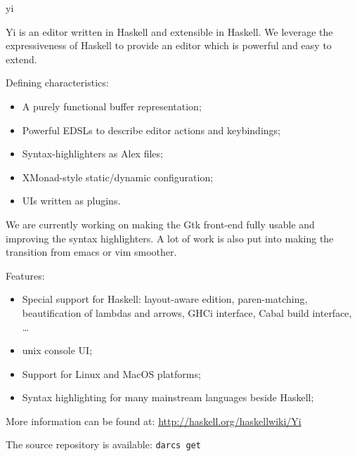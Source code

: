 \begin{hcarentry}[updated]{yi}
\label{yi}
\makeheader

Yi is an editor written in Haskell and extensible in Haskell. We leverage the
expressiveness of Haskell to provide an editor which is powerful and easy to
extend.

Defining characteristics:
\begin{itemize}
\item A purely functional buffer representation;
\item Powerful EDSLs to describe editor actions and keybindings;
\item Syntax-highlighters as Alex files;
\item XMonad-style static/dynamic configuration;
\item UIs written as plugins.
\end{itemize}

We are currently working on making the Gtk front-end fully usable and improving
the syntax highlighters. A lot of work is also put into making the transition
from emacs or vim smoother.

Features:
\begin{itemize}
\item Special support for Haskell: layout-aware edition, paren-matching, beautification of lambdas and arrows, GHCi interface, Cabal build interface, \dots
\item unix console UI;
\item Support for Linux and MacOS platforms;
\item Syntax highlighting for many mainstream languages beside Haskell;
\end{itemize}

\FurtherReading
\begin{compactitem}
\item More information can be found at:
 \url{http://haskell.org/haskellwiki/Yi}

\item The source repository is available:
 \texttt{darcs get}
\end{compactitem}
\end{hcarentry}
